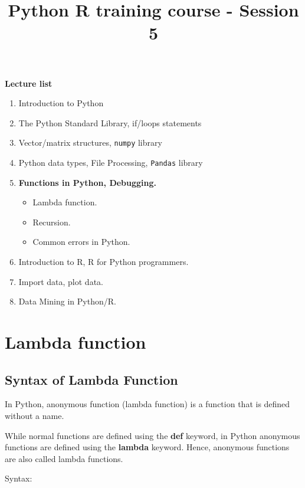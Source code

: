 \documentclass[11pt]{article}
\title{Python R training course - Session 5}
\providecommand{\tightlist}{%
      \setlength{\itemsep}{0pt}\setlength{\parskip}{0pt}}
\begin{document}
    
    
    \maketitle
    
    

    
    \textbf{Lecture list}

\begin{enumerate}
\def\labelenumi{\arabic{enumi}.}
\item
  Introduction to Python
\item
  The Python Standard Library, if/loops statements
\item
  Vector/matrix structures, \texttt{numpy} library
\item
  Python data types, File Processing, \texttt{Pandas} library
\item
  \textbf{Functions in Python, Debugging.}

  \begin{itemize}
  \tightlist
  \item
    Lambda function.
  \item
    Recursion.
  \item
    Common errors in Python.
  \end{itemize}
\item
  Introduction to R, R for Python programmers.
\item
  Import data, plot data.
\item
  Data Mining in Python/R.
\end{enumerate}

    \section{Lambda function}\label{lambda-function}

\subsection{Syntax of Lambda Function}\label{syntax-of-lambda-function}

In Python, anonymous function (lambda function) is a function that is
defined without a name.

While normal functions are defined using the \textbf{def} keyword, in
Python anonymous functions are defined using the \textbf{lambda}
keyword. Hence, anonymous functions are also called lambda functions.

Syntax:
\end{document}
